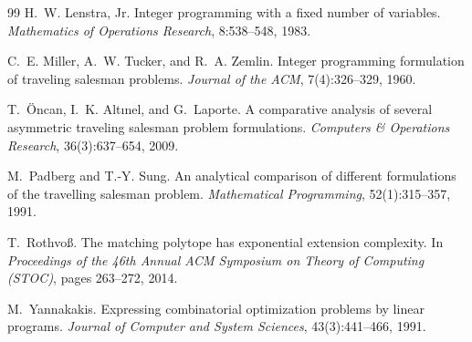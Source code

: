 \documentclass[11pt]{article}
\theoremstyle{definition}
\begin{document}
\begin{thebibliography}{99}
H.~W. Lenstra, Jr.
\newblock Integer programming with a fixed number of variables.
\newblock \emph{Mathematics of Operations Research}, 8:538--548, 1983.

C.~E. Miller, A.~W. Tucker, and R.~A. Zemlin.
\newblock Integer programming formulation of traveling salesman problems.
\newblock \emph{Journal of the ACM}, 7(4):326--329, 1960.

T.~{\"O}ncan, I.~K. Alt{\i}nel, and G.~Laporte.
\newblock A comparative analysis of several asymmetric traveling salesman
problem formulations.
\newblock \emph{Computers \& Operations Research}, 36(3):637--654, 2009.

M.~Padberg and T.-Y. Sung.
\newblock An analytical comparison of different formulations of the travelling
salesman problem.
\newblock \emph{Mathematical Programming}, 52(1):315--357, 1991.

T.~Rothvo{\ss}.
\newblock The matching polytope has exponential extension complexity.
\newblock In \emph{Proceedings of the 46th Annual ACM Symposium on Theory
of Computing (STOC)}, pages 263--272, 2014.

M.~Yannakakis.
\newblock Expressing combinatorial optimization problems by linear programs.
\newblock \emph{Journal of Computer and System Sciences}, 43(3):441--466, 1991.
\end{thebibliography}
\end{document}
